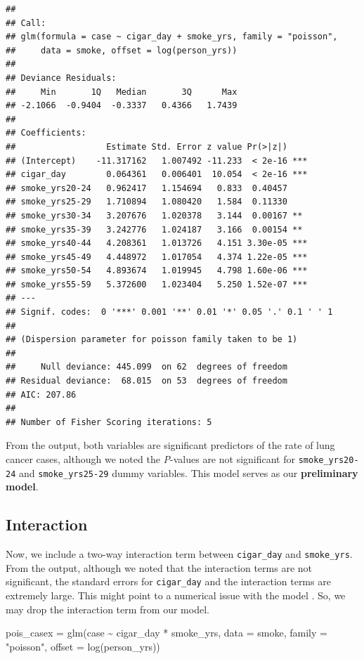 \documentclass[
  10pt,
]{krantz}
\newenvironment{Shaded}{\begin{snugshade}}{\end{snugshade}}
\newcommand{\AttributeTok}[1]{\textcolor[rgb]{0.77,0.63,0.00}{#1}}
\newcommand{\FunctionTok}[1]{\textcolor[rgb]{0.00,0.00,0.00}{#1}}
\newcommand{\NormalTok}[1]{#1}
\newcommand{\OtherTok}[1]{\textcolor[rgb]{0.56,0.35,0.01}{#1}}
\newcommand{\SpecialCharTok}[1]{\textcolor[rgb]{0.00,0.00,0.00}{#1}}
\newcommand{\StringTok}[1]{\textcolor[rgb]{0.31,0.60,0.02}{#1}}
\begin{document}
\begin{verbatim}
## 
## Call:
## glm(formula = case ~ cigar_day + smoke_yrs, family = "poisson", 
##     data = smoke, offset = log(person_yrs))
## 
## Deviance Residuals: 
##     Min       1Q   Median       3Q      Max  
## -2.1066  -0.9404  -0.3337   0.4366   1.7439  
## 
## Coefficients:
##                  Estimate Std. Error z value Pr(>|z|)    
## (Intercept)    -11.317162   1.007492 -11.233  < 2e-16 ***
## cigar_day        0.064361   0.006401  10.054  < 2e-16 ***
## smoke_yrs20-24   0.962417   1.154694   0.833  0.40457    
## smoke_yrs25-29   1.710894   1.080420   1.584  0.11330    
## smoke_yrs30-34   3.207676   1.020378   3.144  0.00167 ** 
## smoke_yrs35-39   3.242776   1.024187   3.166  0.00154 ** 
## smoke_yrs40-44   4.208361   1.013726   4.151 3.30e-05 ***
## smoke_yrs45-49   4.448972   1.017054   4.374 1.22e-05 ***
## smoke_yrs50-54   4.893674   1.019945   4.798 1.60e-06 ***
## smoke_yrs55-59   5.372600   1.023404   5.250 1.52e-07 ***
## ---
## Signif. codes:  0 '***' 0.001 '**' 0.01 '*' 0.05 '.' 0.1 ' ' 1
## 
## (Dispersion parameter for poisson family taken to be 1)
## 
##     Null deviance: 445.099  on 62  degrees of freedom
## Residual deviance:  68.015  on 53  degrees of freedom
## AIC: 207.86
## 
## Number of Fisher Scoring iterations: 5
\end{verbatim}

From the output, both variables are significant predictors of the rate of lung cancer cases, although we noted the \emph{P}-values are not significant for \texttt{smoke\_yrs20-24} and \texttt{smoke\_yrs25-29} dummy variables. This model serves as our \textbf{preliminary model}.

\hypertarget{interaction-2}{%
\subsection{\texorpdfstring{Interaction}{Interaction}}\label{interaction-2}}

Now, we include a two-way interaction term between \texttt{cigar\_day} and \texttt{smoke\_yrs}. From the output, although we noted that the interaction terms are not significant, the standard errors for \texttt{cigar\_day} and the interaction terms are extremely large. This might point to a numerical issue with the model \citep{hosmer2013}. So, we may drop the interaction term from our model.

\begin{Shaded}
\begin{Highlighting}[]
\NormalTok{pois\_casex }\OtherTok{=} \FunctionTok{glm}\NormalTok{(case }\SpecialCharTok{\textasciitilde{}}\NormalTok{ cigar\_day }\SpecialCharTok{*}\NormalTok{ smoke\_yrs, }\AttributeTok{data =}\NormalTok{ smoke,}
                 \AttributeTok{family =} \StringTok{"poisson"}\NormalTok{, }\AttributeTok{offset =} \FunctionTok{log}\NormalTok{(person\_yrs))}
\end{Highlighting}
\end{Shaded}
\end{document}

